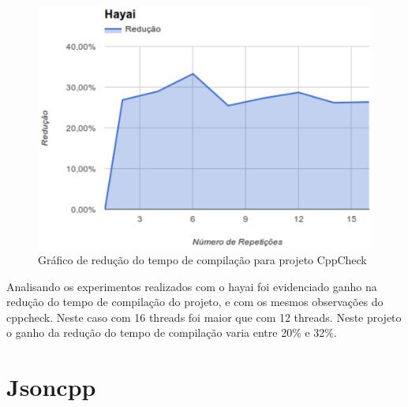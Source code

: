 \begin{figure}[h]
    \centering
        \includegraphics[keepaspectratio=true,scale=1]{figuras/hayai.eps}
    \caption{Gráfico de redução do tempo de compilação para projeto CppCheck}
    \label{hayai}
\end{figure}

Analisando os experimentos realizados com o hayai foi evidenciado ganho
 na redução do tempo de compilação do projeto, e com os mesmos
 observações do cppcheck. Neste caso com 16 threads foi maior que com
 12 threads. Neste projeto o ganho da redução do tempo de
 compilação varia entre 20\% e 32\%.

\section{Jsoncpp}


